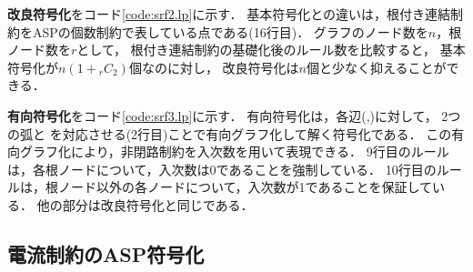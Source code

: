 
%
\textbf{改良符号化}をコード\ref{code:srf2.lp}に示す．
基本符号化との違いは，根付き連結制約をASPの個数制約で表している点である(16行目)．
グラフのノード数を$n$，根ノード数を$r$として，
根付き連結制約の基礎化後のルール数を比較すると，
基本符号化が$n(1+{}_{r}C_{2})$個なのに対し，
改良符号化は$n$個と少なく抑えることができる．
 
\textbf{有向符号化}をコード\ref{code:srf3.lp}に示す．
有向符号化は，各辺(,)に対して，
2つの弧と
を対応させる(2行目)ことで有向グラフ化して解く符号化である．
この有向グラフ化により，非閉路制約を入次数を用いて表現できる．
9行目のルールは，各根ノードについて，入次数は0であることを強制している．
10行目のルールは，根ノード以外の各ノードについて，入次数が1であることを保証している．
他の部分は改良符号化と同じである．

\subsection{電流制約のASP符号化}\label{chap:electrical}




